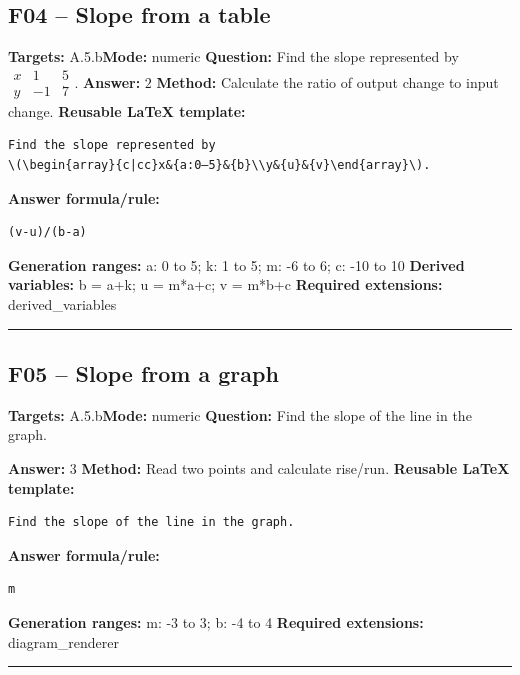 \documentclass[11pt]{article}
\begin{document}
\subsection{F04 -- Slope from a table}
\textbf{Targets:} A.5.b\quad\textbf{Mode:} numeric
\textbf{Question:} Find the slope represented by \(\begin{array}{c|cc}x&1&5\\y&-1&7\end{array}\).
\textbf{Answer:} \(2\)
\textbf{Method:} Calculate the ratio of output change to input change.
\textbf{Reusable LaTeX template:}
\begin{verbatim}
Find the slope represented by
\(\begin{array}{c|cc}x&{a:0–5}&{b}\\y&{u}&{v}\end{array}\).
\end{verbatim}
\textbf{Answer formula/rule:}
\begin{verbatim}
(v-u)/(b-a)
\end{verbatim}
\textbf{Generation ranges:} a: 0 to 5; k: 1 to 5; m: -6 to 6; c: -10 to 10
\textbf{Derived variables:} b = a+k; u = m*a+c; v = m*b+c
\textbf{Required extensions:} derived\_variables
\medskip\hrule\medskip
\subsection{F05 -- Slope from a graph}
\textbf{Targets:} A.5.b\quad\textbf{Mode:} numeric
\textbf{Question:} Find the slope of the line in the graph.
\begin{center}\end{center}
\textbf{Answer:} \(3\)
\textbf{Method:} Read two points and calculate rise/run.
\textbf{Reusable LaTeX template:}
\begin{verbatim}
Find the slope of the line in the graph.
\end{verbatim}
\textbf{Answer formula/rule:}
\begin{verbatim}
m
\end{verbatim}
\textbf{Generation ranges:} m: -3 to 3; b: -4 to 4
\textbf{Required extensions:} diagram\_renderer
\medskip\hrule\medskip
\end{document}
